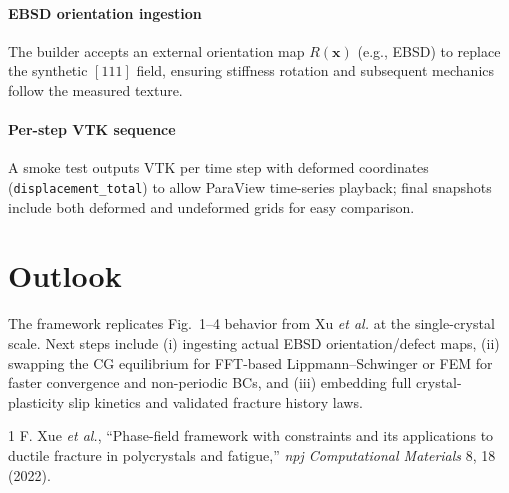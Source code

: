 \documentclass[11pt]{article}
\begin{document}
\paragraph{EBSD orientation ingestion} The builder accepts an external orientation map $R(\mathbf{x})$ (e.g., EBSD) to replace the synthetic $[111]$ field, ensuring stiffness rotation and subsequent mechanics follow the measured texture.

\paragraph{Per-step VTK sequence} A smoke test outputs VTK per time step with deformed coordinates (\texttt{displacement\_total}) to allow ParaView time-series playback; final snapshots include both deformed and undeformed grids for easy comparison.

\section{Outlook}
The framework replicates Fig.~1--4 behavior from Xu \emph{et al.}\cite{paper} at the single-crystal scale. Next steps include (i) ingesting actual EBSD orientation/defect maps, (ii) swapping the CG equilibrium for FFT-based Lippmann--Schwinger or FEM for faster convergence and non-periodic BCs, and (iii) embedding full crystal-plasticity slip kinetics and validated fracture history laws.

\begin{thebibliography}{1}
 F. Xue \emph{et al.}, ``Phase-field framework with constraints and its applications to ductile fracture in polycrystals and fatigue,'' \emph{npj Computational Materials} 8, 18 (2022).
\end{thebibliography}
\end{document}
